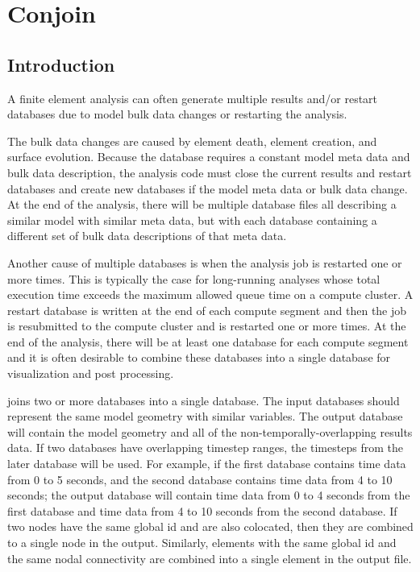 \chapter{Conjoin}\label{ch:conjoin}
\section{Introduction}
A finite element analysis can often generate multiple results and/or
restart databases due to model bulk data changes or restarting the
analysis. 

The bulk data changes are caused by element death, element creation,
and surface evolution.  Because the \exo{} database requires a
constant model meta data and bulk data description, the analysis code
must close the current results and restart databases and create new
databases if the model meta data or bulk data change. At the end of
the analysis, there will be multiple database files all describing a
similar model with similar meta data, but with each database
containing a different set of bulk data descriptions of that meta
data.

Another cause of multiple \exo{} databases is when the analysis job is
restarted one or more times.  This is typically the case for
long-running analyses whose total execution time exceeds the maximum
allowed queue time on a compute cluster.  A restart database is
written at the end of each compute segment and then the job is
resubmitted to the compute cluster and is restarted one or more
times. At the end of the analysis, there will be at least one database
for each compute segment and it is often desirable to combine these
databases into a single database for visualization and post processing.

\conjoin{} joins two or more \exo{} databases into a single
database. The input databases should represent the same model geometry
with similar variables. The output database will contain the model
geometry and all of the non-temporally-overlapping results data. If
two databases have overlapping timestep ranges, the timesteps from the
later database will be used. For example, if the first database
contains time data from 0 to 5 seconds, and the second database
contains time data from 4 to 10 seconds; the output database will
contain time data from 0 to 4 seconds from the first database and time
data from 4 to 10 seconds from the second database.  If two nodes have
the same global id and are also colocated, then they are combined to a
single node in the output. Similarly, elements with the same global id
and the same nodal connectivity are combined into a single element in
the output file.

